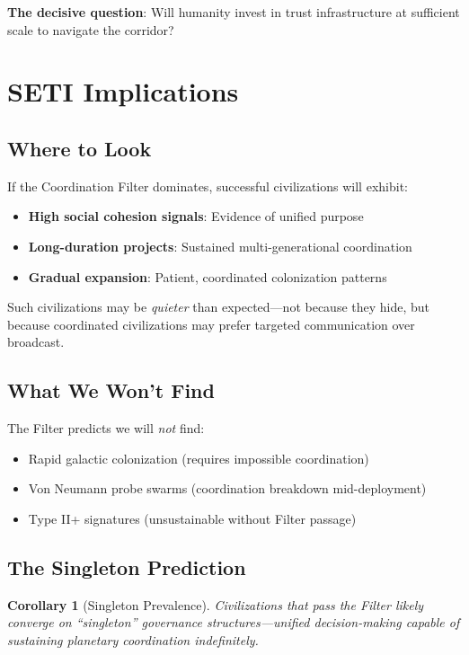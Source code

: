 \documentclass[11pt,a4paper]{article}
\newtheorem{corollary}{Corollary}
\begin{document}
\textbf{The decisive question}: Will humanity invest in trust infrastructure at sufficient scale to navigate the corridor?

\section{SETI Implications}

\subsection{Where to Look}

If the Coordination Filter dominates, successful civilizations will exhibit:
\begin{itemize}
    \item \textbf{High social cohesion signals}: Evidence of unified purpose
    \item \textbf{Long-duration projects}: Sustained multi-generational coordination
    \item \textbf{Gradual expansion}: Patient, coordinated colonization patterns
\end{itemize}

Such civilizations may be \textit{quieter} than expected---not because they hide, but because coordinated civilizations may prefer targeted communication over broadcast.

\subsection{What We Won't Find}

The Filter predicts we will \textit{not} find:
\begin{itemize}
    \item Rapid galactic colonization (requires impossible coordination)
    \item Von Neumann probe swarms (coordination breakdown mid-deployment)
    \item Type II+ signatures (unsustainable without Filter passage)
\end{itemize}

\subsection{The Singleton Prediction}

\begin{corollary}[Singleton Prevalence]
Civilizations that pass the Filter likely converge on ``singleton'' governance structures---unified decision-making capable of sustaining planetary coordination indefinitely.
\end{corollary}
\end{document}
